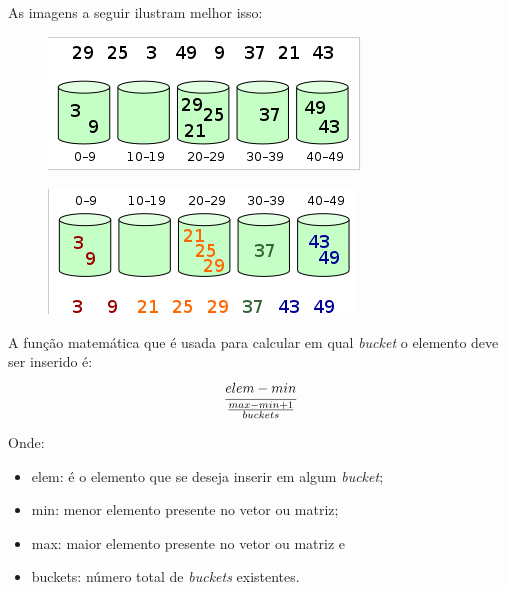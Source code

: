 		As imagens a seguir ilustram melhor isso:
		\begin{figure}[H]
			\includegraphics[scale=1]{pictures/01}
		\end{figure}
		
		\begin{figure}[H]
			\includegraphics[scale=1]{pictures/02}
		\end{figure}
		
		A função matemática que é usada para calcular em qual \textit{bucket} o elemento deve ser inserido é:
		$$\cfrac{elem - min}{\frac{max - min + 1}{buckets}}$$
		
		Onde:
		\begin{itemize}
			\item elem: é o elemento que se deseja inserir em algum \textit{bucket};
			\item min: menor elemento presente no vetor ou matriz;
			\item max: maior elemento presente no vetor ou matriz e
			\item buckets: número total de \textit{buckets} existentes.
		\end{itemize}
		
